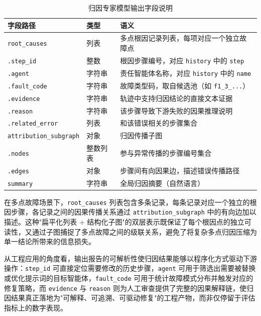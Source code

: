 \begin{table}[htbp]
  \centering
  \caption{归因专家模型输出字段说明}
  \label{tab:output_fields}
  \renewcommand{\arraystretch}{1.3}
  \small
  \begin{tabular}{lll}
    \hline
    \textbf{字段路径} & \textbf{类型} & \textbf{语义} \\
    \hline
    \texttt{root\_causes}          & 列表     & 多点根因记录列表，每项对应一个独立故障点 \\
    \quad\texttt{.step\_id}        & 整数     & 根因步骤编号，对应 \texttt{history} 中的 \texttt{step} \\
    \quad\texttt{.agent}           & 字符串   & 责任智能体名称，对应 \texttt{history} 中的 \texttt{name} \\
    \quad\texttt{.fault\_code}     & 字符串   & 故障类型码，取自候选池（如 \texttt{f1\_3\_...}） \\
    \quad\texttt{.evidence}        & 字符串   & 轨迹中支持归因结论的直接文本证据 \\
    \quad\texttt{.reason}          & 字符串   & 该步骤导致下游失败的因果推理说明 \\
    \quad\texttt{.related\_error}  & 列表   & 和该错误相关的步骤集合 \\
    \texttt{attribution\_subgraph} & 对象     & 归因传播子图 \\
    \quad\texttt{.nodes}           & 整数列表 & 参与异常传播的步骤编号集合 \\
    \quad\texttt{.edges}           & 对象     & 步骤间有向因果边，描述错误传播路径 \\
    \texttt{summary}               & 字符串   & 全局归因摘要（自然语言） \\
    \hline
  \end{tabular}
\end{table}
 
在多点故障场景下，\texttt{root\_causes} 列表包含多条记录，每条记录对应一个独立的根因步骤，各记录之间的因果传播关系通过 \texttt{attribution\_subgraph} 中的有向边加以描述。这种"扁平化列表 + 结构化子图"的双层表示既保证了每个根因点的独立可读性，又通过子图捕捉了多点故障之间的级联关系，避免了将复杂多点归因压缩为单一结论所带来的信息损失。
 
从工程应用的角度看，输出报告的可解析性使归因结果能够以程序化方式驱动下游操作：\texttt{step\_id} 可直接定位需要修改的历史步骤，\texttt{agent} 可用于筛选出需要被替换或优化提示词的目标智能体，\texttt{fault\_code} 可用于统计故障模式分布并触发对应的修复策略，而 \texttt{evidence} 与 \texttt{reason} 则为人工审查提供了完整的因果解释链，使归因结果真正落地为"可解释、可追溯、可驱动修复"的工程产物，而非仅停留于评估指标上的数字表现。


